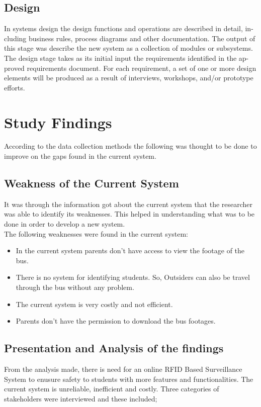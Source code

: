 \subsection{Design}
In systems design the design functions and operations are described in detail, in-
cluding business rules, process diagrams and other documentation. The output of
this stage was describe the new system as a collection of modules or subsystems.
The design stage takes as its initial input the requirements identified in the ap-
proved requirements document. For each requirement, a set of one or more design
elements will be produced as a result of interviews, workshops, and/or prototype
efforts.

\section{Study Findings}
\par According to the data collection methods the following was thought to be done to
improve on the gaps found in the current system.
\subsection{Weakness of the Current System}
It was through the information got about the current system that the researcher
was able to identify its weaknesses. This helped in understanding what was to be
done in order to develop a new system.\\
The following weaknesses were found in the current system:
\begin{itemize}
    \item In the current system parents don't have access to view the footage of the bus.
\item There is no system for identifying students. So, Outsiders can also be travel through the bus without any problem.
\item The current system is very costly and not efficient.
\item Parents don't have the permission to download the bus footages.
\end{itemize}
\subsection{Presentation and Analysis of the findings}
\par From the analysis made, there is need for an online RFID Based Surveillance System to enusure safety to students with more features and functionalities. The current system is unreliable, inefficient and costly. Three
categories of stakeholders were interviewed and these included;
